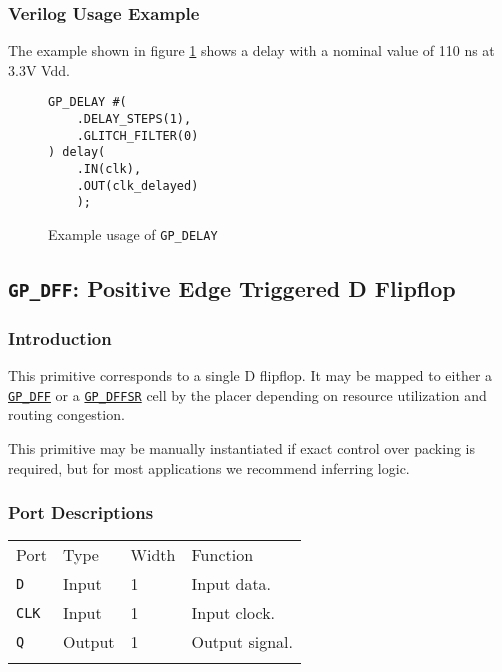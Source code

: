 \documentclass[11pt]{article}
\newcommand{\tokenstyle}[1]{\texttt{#1}}
\newcommand{\whenstyle}[1]{{\fontseries{sb}\selectfont#1}}
\newcommand{\tokenref}[2]{\hyperref[#2]{\tokenstyle{#1}}}
\newcommand{\thinhline}{\Xhline{1\arrayrulewidth}}
\newcommand{\thickhline}{\Xhline{2.5\arrayrulewidth}}
\begin{document}
\subsubsection{Verilog Usage Example}

The example shown in figure \ref{gp-delay-example} shows a delay with a nominal value of 110 ns at 3.3V Vdd.

\begin{figure}[h]
\begin{lstlisting}
GP_DELAY #(
	.DELAY_STEPS(1),
	.GLITCH_FILTER(0)
) delay(
	.IN(clk),
	.OUT(clk_delayed)
	);
\end{lstlisting}
\caption{Example usage of \tokenstyle{GP\_DELAY}}
\label{gp-delay-example}
\end{figure}


\pagebreak
\subsection{\tokenstyle{GP\_DFF}: Positive Edge Triggered D Flipflop}
\label{gp-dff}

\subsubsection{Introduction}
This primitive corresponds to a single D flipflop. It may be mapped to either a \tokenref{GP\_DFF}{gp-dff} or a
\tokenref{GP\_DFFSR}{gp-dffsr} cell by the placer depending on resource utilization and routing congestion.

This primitive may be manually instantiated if exact control over packing is required, but for most applications we
recommend inferring logic.

\subsubsection{Port Descriptions}

\begin{tabularx}{\textwidth}{lllX}
\thinhline
\whenstyle{Port} & \whenstyle{Type} & \whenstyle{Width} & \whenstyle{Function} \\
\thickhline
\tokenstyle{D} & Input & 1 & Input data. \\
\thinhline
\tokenstyle{CLK} & Input & 1 & Input clock. \\
\thinhline
\tokenstyle{Q} & Output & 1 & Output signal. \\
\thinhline
\end{tabularx}
\end{document}
